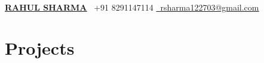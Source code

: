 \documentclass[letterpaper,10pt]{article}
\begin{document}
\begin{center}
  \small
  \textbf{\Large \href{https://rahulwrites.onrender.com}{\underline{RAHUL SHARMA}}} \hspace{0.5cm}
  \faPhone\ +91 8291147114 \hspace{0.5cm}
  \href{mailto:rsharma122703@gmail.com}{\faEnvelope\ \underline{rsharma122703@gmail.com}} \hspace{0.5cm}
  \href{https://github.com/rahul122703}{\underline{\faGithub}} \hspace{0.5cm}
\textbar \hspace{0.5cm}
\href{https://www.linkedin.com/in/rahul122703/}{\underline{\faLinkedin}}

\end{center}


\section{Projects}
\end{document}
